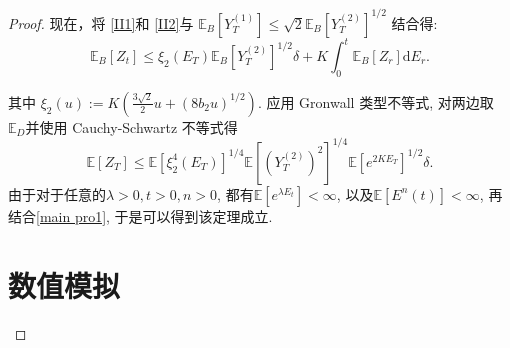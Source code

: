 \begin{proof}
	现在，将 \cref{II1}和 \cref{II2}与  $\mathbb{E}_B[Y_T^{(1)}]\leq\sqrt{2}\mathbb{E}_B[Y_T^{(2)}]^{1/2}$ 结合得:
	\begin{equation*}
		\mathbb{E}_B[Z_t] 
		\leq \xi_2(E_T)\mathbb{E}_B[Y_T^{(2)}]^{1/2}\delta + K\int_0^t\mathbb{E}_B[Z_r] \mathrm{d}E_r.
	\end{equation*}
	
	其中 $\xi_2(u) := K(\frac{3\sqrt{2}}{2}u + (8b_2u)^{1/2}).$
	应用 Gronwall 类型不等式, 对两边取 $ \mathbb{E}_D $并使用 Cauchy-Schwartz 不等式得 
	\begin{equation*}
		\mathbb{E}[Z_T] \leq \mathbb{E}[\xi_2^4(E_T)]^{1/4}\mathbb{E}[(Y_T^{(2)})^2]^{1/4}\mathbb{E}[e^{2KE_T}]^{1/2}\delta.
	\end{equation*}
	由于对于任意的$\lambda>0, t>0,n>0$, 都有$\mathbb{E}[e^{\lambda E_t}] < \infty$, 以及$\mathbb{E}[E^n(t)] < \infty$, 再结合\cref{main pro1}, 于是可以得到该定理成立.
	
	
	\section{数值模拟}
	

\end{proof}
